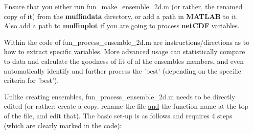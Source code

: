 Ensure that you either run \textsf{\footnotesize fun\_make\_ensemble\_2d.m} (or rather, the renamed copy of it) from the \textbf{muffindata} directory, or add a path in \textbf{MATLAB} to it. \uline{Also} add a path to \textbf{muffinplot} if you are going to process \textbf{netCDF} variables.

\vspace{2mm}

\noindent Within the code of \textsf{\footnotesize fun\_process\_ensemble\_2d.m} are instructions/directions as to how to extract specific variables. More advanced usage can statistically compare to data and calculate the goodness of fit of al the ensembles members, and even automatically identify and further process the 'best' (depending on the specific criteria for 'best').

\vspace{1mm}
Unlike creating ensembles, \textsf{\footnotesize fun\_process\_ensemble\_2d.m} needs to be directly edited (or rather: create a copy, rename the file \uline{and} the function name at the top of the file, and edit that). The basic set-up is as follows and requires 4 steps (which are clearly marked in the code):

